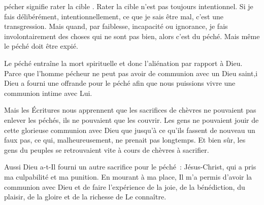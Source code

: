 


 \og pécher \fg{} signifie \og rater la cible \fg{}.
 Rater la cible n'est pas toujours intentionnel.
 Si je fais délibérément, intentionnellement, ce que je sais être mal,
 c'est une transgression. Mais quand, par faiblesse, incapacité ou ignorance,
 je fais involontairement des choses qui ne sont pas bien, alors c'est du péché.
 Mais même le péché doit être expié.


Le péché entraîne la mort spirituelle et donc l'aliénation par rapport à Dieu.
 Parce que l'homme pécheur ne peut pas avoir de communion avec un Dieu saint,i
 Dieu a fourni une offrande pour le péché afin que nous puissions vivre
 une communion intime avec Lui.

Mais les Écritures nous apprennent que les sacrifices de chèvres
 ne pouvaient pas enlever les péchés, ils ne pouvaient que les couvrir.
 Les gens ne pouvaient jouir de cette glorieuse communion avec Dieu
 que jusqu'à ce qu'ils fassent de nouveau un faux pas, ce qui, malheureusement,
 ne prenait pas longtemps.
 Et bien sûr, les gens du peuples se retrouvaient vite
 à cours de chèvres à sacrifier.

Aussi Dieu a-t-Il fourni un autre sacrifice pour le péché~: Jésus-Christ,
 qui a pris ma culpabilité et ma punition.
 En mourant à ma place, Il m'a permis d'avoir la communion avec Dieu
 et de faire l'expérience de la joie, de la bénédiction, du plaisir,
 de la gloire et de la richesse de Le connaître. 

\dvrule





